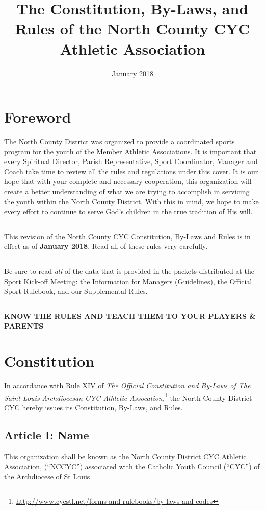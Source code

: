 \documentclass[letteraper,10pt,oneside,draft]{memoir}
\title{The Constitution, By-Laws, and Rules of the North County CYC Athletic Association}
\date{January 2018}
\author{}
\begin{document}
\maketitle

\frontmatter
\tableofcontents
\mainmatter
\chapter{Foreword}
The North County District was organized to provide a coordinated sports program for the youth of the Member Athletic Associations.  It is important that every Spiritual Director, Parish Representative, Sport Coordinator, Manager and Coach take time to review all the rules and regulations under this cover.  It is our hope that with your complete and necessary cooperation, this organization will create a better understanding of what we are trying to accomplish in servicing the youth within the North County District.  With this in mind, we hope to make every effort to continue to serve God's children in the true tradition of His will.
\plainbreak{4}
This revision of the North County CYC Constitution, By-Laws and Rules is in effect as of \textbf{January 2018}.  
Read all of these rules very carefully.  
\plainbreak{4}
Be sure to read {\em all} of the data that is provided in the packets distributed at the Sport Kick-off Meeting:  the Information for Managers (Guidelines), the Official Sport Rulebook, and our Supplemental Rules.
\plainbreak{4}
\textbf{KNOW THE RULES AND TEACH THEM TO YOUR PLAYERS \& PARENTS}

\chapter{Constitution}
\label{chap:const}
In accordance with Rule XIV of {\em The Official Constitution and By-Laws of The Saint Louis Archdiocesan CYC Athletic Assocation,}\footnote{\url{http://www.cycstl.net/forms-and-rulebooks/by-laws-and-codes}} the North County District CYC hereby issues its Constitution, By-Laws, and Rules.

\section{Article I: Name}
\label{sec:const-1}
This organization shall be known as the North County District CYC Athletic Association, (“NCCYC”) associated with the Catholic Youth Council (``CYC'') of the Archdiocese of St Louis.
\end{document}
